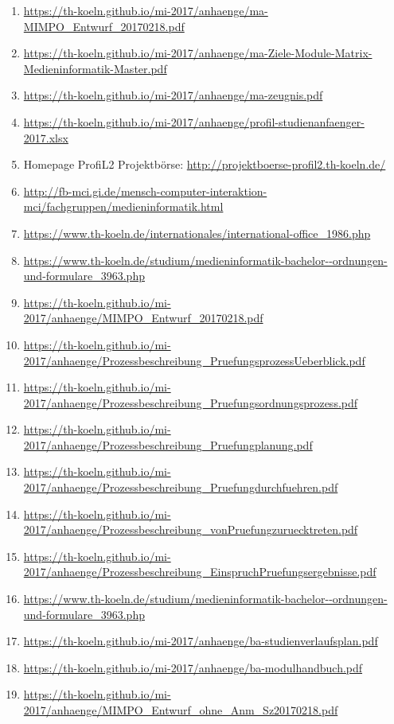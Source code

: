 \documentclass[BCOR12mm,DIV11,titlepage,a4paper,oneside,10pt]{scrbook}
\begin{document}
\begin{sloppypar}
\begin{flushleft}
\begin{enumerate}
\item{\url{https://th-koeln.github.io/mi-2017/anhaenge/ma-MIMPO\_Entwurf\_20170218.pdf}} 
\item{\url{https://th-koeln.github.io/mi-2017/anhaenge/ma-Ziele-Module-Matrix-Medieninformatik-Master.pdf}} 
\item{\url{https://th-koeln.github.io/mi-2017/anhaenge/ma-zeugnis.pdf}} 
\item{\url{https://th-koeln.github.io/mi-2017/anhaenge/profil-studienanfaenger-2017.xlsx}} 
\item{Homepage ProfiL2 Projektbörse: \url{http://projektboerse-profil2.th-koeln.de/} } 
\item{\url{http://fb-mci.gi.de/mensch-computer-interaktion-mci/fachgruppen/medieninformatik.html}} 
\item{\url{https://www.th-koeln.de/internationales/international-office\_1986.php}} 
\item{\url{https://www.th-koeln.de/studium/medieninformatik-bachelor--ordnungen-und-formulare\_3963.php}} 
\item{\url{https://th-koeln.github.io/mi-2017/anhaenge/MIMPO\_Entwurf\_20170218.pdf}} 
\item{\url{https://th-koeln.github.io/mi-2017/anhaenge/Prozessbeschreibung\_PruefungsprozessUeberblick.pdf}} 
\item{\url{https://th-koeln.github.io/mi-2017/anhaenge/Prozessbeschreibung\_Pruefungsordnungsprozess.pdf}} 
\item{\url{https://th-koeln.github.io/mi-2017/anhaenge/Prozessbeschreibung\_Pruefungplanung.pdf}} 
\item{\url{https://th-koeln.github.io/mi-2017/anhaenge/Prozessbeschreibung\_Pruefungdurchfuehren.pdf}} 
\item{\url{https://th-koeln.github.io/mi-2017/anhaenge/Prozessbeschreibung\_vonPruefungzuruecktreten.pdf}} 
\item{\url{https://th-koeln.github.io/mi-2017/anhaenge/Prozessbeschreibung\_EinspruchPruefungsergebnisse.pdf}} 
\item{\url{https://www.th-koeln.de/studium/medieninformatik-bachelor--ordnungen-und-formulare\_3963.php}} 
\item{\url{https://th-koeln.github.io/mi-2017/anhaenge/ba-studienverlaufsplan.pdf}} 
\item{\url{https://th-koeln.github.io/mi-2017/anhaenge/ba-modulhandbuch.pdf}} 
\item{\url{https://th-koeln.github.io/mi-2017/anhaenge/MIMPO\_Entwurf\_ohne\_Anm\_Sz20170218.pdf}} 

\end{enumerate}
\end{flushleft}
\end{sloppypar}
\end{document}
